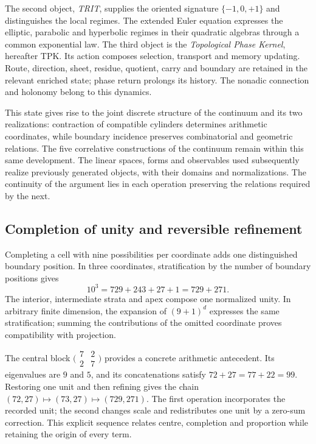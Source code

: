 The second object, \emph{TRIT}, supplies the oriented signature \(\{-1,0,+1\}\) and distinguishes the local regimes. The extended Euler equation expresses the elliptic, parabolic and hyperbolic regimes in their quadratic algebras through a common exponential law. The third object is the \emph{Topological Phase Kernel}, hereafter TPK. Its action composes selection, transport and memory updating. Route, direction, sheet, residue, quotient, carry and boundary are retained in the relevant enriched state; phase return prolongs its history. The nonadic connection and holonomy belong to this dynamics.

This state gives rise to the joint discrete structure of the continuum and its two realizations: contraction of compatible cylinders determines arithmetic coordinates, while boundary incidence preserves combinatorial and geometric relations. The five correlative constructions of the continuum remain within this same development. The linear spaces, forms and observables used subsequently realize previously generated objects, with their domains and normalizations. The continuity of the argument lies in each operation preserving the relations required by the next.

\subsection*{Completion of unity and reversible refinement}
Completing a cell with nine possibilities per coordinate adds one distinguished boundary position. In three coordinates, stratification by the number of boundary positions gives
\[
10^3=729+243+27+1=729+271.
\]
The interior, intermediate strata and apex compose one normalized unity. In arbitrary finite dimension, the expansion of \((9+1)^d\) expresses the same stratification; summing the contributions of the omitted coordinate proves compatibility with projection.

The central block \(\bigl(\begin{smallmatrix}7&2\\2&7\end{smallmatrix}\bigr)\) provides a concrete arithmetic antecedent. Its eigenvalues are \(9\) and \(5\), and its concatenations satisfy \(72+27=77+22=99\). Restoring one unit and then refining gives the chain \((72,27)\mapsto(73,27)\mapsto(729,271)\). The first operation incorporates the recorded unit; the second changes scale and redistributes one unit by a zero-sum correction. This explicit sequence relates centre, completion and proportion while retaining the origin of every term.

